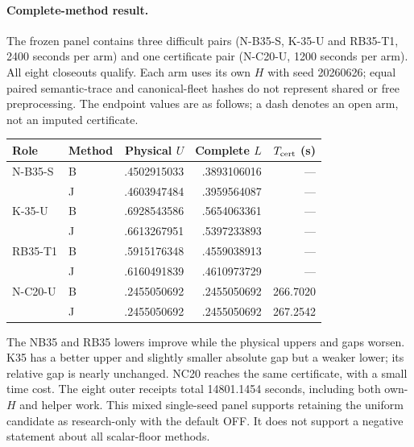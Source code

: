\paragraph{Complete-method result.}
The frozen panel contains three difficult pairs (N-B35-S, K-35-U and
RB35-T1, 2400 seconds per arm) and one certificate pair (N-C20-U,
1200 seconds per arm). All eight closeouts qualify. Each arm uses its own
$H$ with seed 20260626; equal paired semantic-trace and canonical-fleet
hashes do not represent shared or free preprocessing. The endpoint values
are as follows; a dash denotes an open arm, not an imputed certificate.
\begin{center}
\begin{tabular}{llrrr}
\toprule
Role & Method & Physical $U$ & Complete $L$ & $T_{\rm cert}$ (s)\\
\midrule
N-B35-S & B & .4502915033 & .3893106016 & ---\\
        & J & .4603947484 & .3959564087 & ---\\
K-35-U  & B & .6928543586 & .5654063361 & ---\\
        & J & .6613267951 & .5397233893 & ---\\
RB35-T1 & B & .5915176348 & .4559038913 & ---\\
        & J & .6160491839 & .4610973729 & ---\\
N-C20-U & B & .2455050692 & .2455050692 & 266.7020\\
        & J & .2455050692 & .2455050692 & 267.2542\\
\bottomrule
\end{tabular}
\end{center}
The NB35 and RB35 lowers improve while the physical uppers and gaps worsen.
K35 has a better upper and slightly smaller absolute gap but a weaker lower;
its relative gap is nearly unchanged. NC20 reaches the same certificate,
with a small time cost. The eight outer receipts total 14801.1454 seconds,
including both own-$H$ and helper work. This mixed single-seed panel supports
retaining the uniform candidate as research-only with the default OFF.
It does not support a negative statement about all scalar-floor methods.
